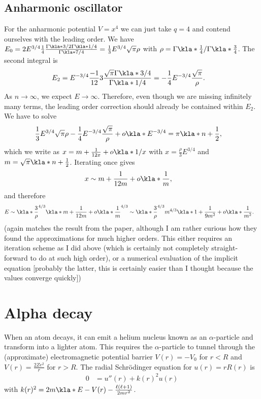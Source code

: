 \documentclass[english, parskip=full]{scrartcl}
\begin{document}
\subsection{Anharmonic oscillator}
For the anharmonic potential $V=x^4$ we can just take $q=4$ and contend ourselves with the leading order.
We have $E_0 = 2E^{3/4} \frac{1}{4} \frac{\Gamma\kla*{3/2} \Gamma\kla*{1/4}}{\Gamma\kla*{7/4}} = \frac{1}{3} E^{3/4} \sqrt{\pi} \rho$ with $\rho = \Gamma\kla*{\frac{1}{4}} / \Gamma\kla*{\frac{3}{4}}$.
The second integral is
\begin{align}
E_2 &= E^{-3/4} \frac{-1}{12} 3 \frac{\sqrt{\pi} \Gamma\kla*{3/4}}{\Gamma\kla*{1/4}} = -\frac{1}{4} E^{-3/4} \frac{\sqrt{\pi}}{\rho}.
\end{align}
As $n\rightarrow\infty$, we expect $E\rightarrow\infty$.
Therefore, even though we are missing infinitely many terms, the leading order correction should already be contained within $E_2$.
We have to solve
\begin{align}
\frac{1}{3} E^{3/4} \sqrt{\pi}\rho - \frac{1}{4} E^{-3/4} \frac{\sqrt{\pi}}{\rho} + o\kla*{E^{-3/4}} &= \pi \kla*{n+\frac{1}{2}},
\end{align}
which we write as $x = m + \frac{1}{12x} + o\kla*{1/x}$ with $x=\frac{\rho}{3}E^{3/4}$ and $m=\sqrt{\pi} \kla*{n+\frac{1}{2}}$.
Iterating once gives
\begin{align}
x&\sim m + \frac{1}{12m} + o\kla*{\frac{1}{m}},
\end{align}
and therefore
\begin{align}
E&\sim \kla*{\frac{3}{\rho}}^{4/3} \kla*{m + \frac{1}{12m} + o\kla*{\frac{1}{m}}}^{4/3} \sim \kla*{\frac{3}{\rho}}^{4/3} m^{4/3} \kla*{1 + \frac{1}{9m^2} + o\kla*{\frac{1}{m^2}}}.
\end{align}
(again matches the result from the paper, although I am rather curious how they found the approximations for much higher orders.
This either requires an iteration scheme as I did above (which is certainly not completely straight-forward to do at such high order), or a numerical evaluation of the implicit equation [probably the latter, this is certainly easier than I thought because the values converge quickly])


\section{Alpha decay}
When an atom decays, it can emit a helium nucleus known as an $\alpha$-particle and transform into a lighter atom.
This requires the $\alpha$-particle to tunnel through the (approximate) electromagnetic potential barrier $V(r)=-V_0$ for $r<R$ and $V(r) = \frac{2Ze^2}{r}$ for $r>R$.
The radial Schrödinger equation for $u(r)=rR(r)$ is
\begin{align}
0 &= u''(r) + k(r)^2 u(r)
\end{align}
with $k(r)^2=2m\kla*{E-V(r) - \frac{\ell(\ell+1)}{2mr^2}}$.
\end{document}
